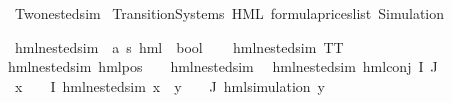 %
\begin{isabellebody}%
%
%
\isadelimtheory
%
\endisadelimtheory
%
\isatagtheory
{}\isamarkupfalse%
\ Two{\isacharunderscore}{\kern0pt}nested{\isacharunderscore}{\kern0pt}sim\isanewline
{}\ Transition{\isacharunderscore}{\kern0pt}Systems\ HML\ formula{\isacharunderscore}{\kern0pt}prices{\isacharunderscore}{\kern0pt}list\ Simulation\isanewline
{}%
\endisatagtheory
{\isafoldtheory}%
%
\isadelimtheory
%
\endisadelimtheory
%
\isadelimdocument
%
\endisadelimdocument
%
\isatagdocument
%
\isamarkuptrue%
%
\endisatagdocument
{\isafolddocument}%
%
\isadelimdocument
%
\endisadelimdocument
%
\begin{isamarkuptext}%
%
\end{isamarkuptext}\isamarkuptrue%
\isamarkupfalse%
\ hml{\isacharunderscore}{\kern0pt}{}{\isacharunderscore}{\kern0pt}nested{\isacharunderscore}{\kern0pt}sim\ {\isacharcolon}{\kern0pt}{\isacharcolon}{\kern0pt}\ {\isachardoublequoteopen}{\isacharparenleft}{\kern0pt}{\isacharprime}{\kern0pt}a{\isacharcomma}{\kern0pt}\ {\isacharprime}{\kern0pt}s{\isacharparenright}{\kern0pt}\ hml\ {\isasymRightarrow}\ bool{\isachardoublequoteclose}\ \isanewline
\ \ \isanewline
{\isachardoublequoteopen}hml{\isacharunderscore}{\kern0pt}{}{\isacharunderscore}{\kern0pt}nested{\isacharunderscore}{\kern0pt}sim\ TT{\isachardoublequoteclose}\ {\isacharbar}{\kern0pt}\isanewline
{\isachardoublequoteopen}hml{\isacharunderscore}{\kern0pt}{}{\isacharunderscore}{\kern0pt}nested{\isacharunderscore}{\kern0pt}sim\ {\isacharparenleft}{\kern0pt}hml{\isacharunderscore}{\kern0pt}pos\ {\isasymalpha}\ {\isasymphi}{\isacharparenright}{\kern0pt}{\isachardoublequoteclose}\ \ {\isachardoublequoteopen}hml{\isacharunderscore}{\kern0pt}{}{\isacharunderscore}{\kern0pt}nested{\isacharunderscore}{\kern0pt}sim\ {\isasymphi}{\isachardoublequoteclose}\ {\isacharbar}{\kern0pt}\isanewline
{\isachardoublequoteopen}hml{\isacharunderscore}{\kern0pt}{}{\isacharunderscore}{\kern0pt}nested{\isacharunderscore}{\kern0pt}sim\ {\isacharparenleft}{\kern0pt}hml{\isacharunderscore}{\kern0pt}conj\ I\ J\ {\isasymPhi}{\isacharparenright}{\kern0pt}{\isachardoublequoteclose}\ \isanewline
{}\ {\isachardoublequoteopen}{\isacharparenleft}{\kern0pt}{\isasymforall}x\ {\isasymin}\ {\isacharparenleft}{\kern0pt}{\isasymPhi}\ {\isacharbackquote}{\kern0pt}\ I{\isacharparenright}{\kern0pt}{\isachardot}{\kern0pt}\ hml{\isacharunderscore}{\kern0pt}{}{\isacharunderscore}{\kern0pt}nested{\isacharunderscore}{\kern0pt}sim\ x{\isacharparenright}{\kern0pt}\ {\isasymand}\ {\isacharparenleft}{\kern0pt}{\isasymforall}y\ {\isasymin}\ {\isacharparenleft}{\kern0pt}{\isasymPhi}\ {\isacharbackquote}{\kern0pt}\ J{\isacharparenright}{\kern0pt}{\isachardot}{\kern0pt}\ hml{\isacharunderscore}{\kern0pt}simulation\ y{\isacharparenright}{\kern0pt}{\isachardoublequoteclose}\isanewline

\end{isabellebody}
